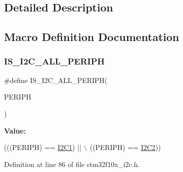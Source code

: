 \subsection{Detailed Description}


\subsection{Macro Definition Documentation}
\mbox{\label{group___i2_c___exported___constants_ga2e57489a40603d6ab7ff115b94eeb303}} 
\subsubsection{\texorpdfstring{I\+S\+\_\+\+I2\+C\+\_\+\+A\+L\+L\+\_\+\+P\+E\+R\+I\+PH}{IS\_I2C\_ALL\_PERIPH}}
{\footnotesize\ttfamily \#define I\+S\+\_\+\+I2\+C\+\_\+\+A\+L\+L\+\_\+\+P\+E\+R\+I\+PH(\begin{DoxyParamCaption}\item[{}]{P\+E\+R\+I\+PH }\end{DoxyParamCaption})}

{\bfseries Value\+:}
\begin{DoxyCode}
(((PERIPH) == \hyperlink{group___peripheral__declaration_gab45d257574da6fe1f091cc45b7eda6cc}{I2C1}) || \(\backslash\)
                                   ((PERIPH) == \hyperlink{group___peripheral__declaration_gafa60ac20c1921ef1002083bb3e1f5d16}{I2C2}))
\end{DoxyCode}


Definition at line 86 of file stm32f10x\+\_\+i2c.\+h.

